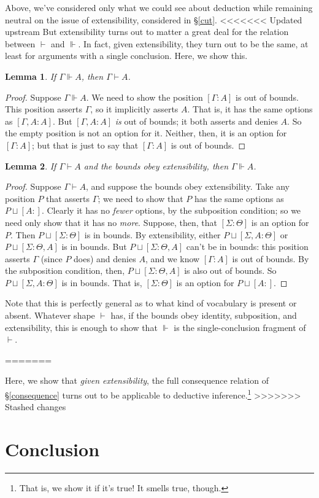 \documentclass{article}
\newcommand{\G}{\ensuremath{\Gamma}}
\newcommand{\Sig}{\ensuremath{\Sigma}}
\newcommand{\pcup}{\ensuremath{\sqcup}}
\newcommand{\pos}[2]{\ensuremath{[#1:#2]}}
\newcommand{\cns}{\vdash}
\newcommand{\ded}{\Vdash}
\newtheorem{lem}{Lemma}
\begin{document}
Above, we've considered only what we could see about deduction while remaining neutral on the issue of extensibility, considered in \S\ref{cut}.
<<<<<<< Updated upstream
But extensibility turns out to matter a great deal for the relation between $\cns$ and $\ded$.
In fact, given extensibility, they turn out to be the same, at least for arguments with a single conclusion. 
Here, we show this.

\begin{lem}
If $\G \ded A$, then $\G \cns A$.
\end{lem}

\begin{proof}
Suppose $\G \ded A$. 
We need to show the position $\pos{\G}{A}$ is out of bounds.
This position asserts $\G$, so it implicitly asserts $A$. 
That is, it has the same options as $\pos{\G, A}{A}$.
But $\pos{\G, A}{A}$ {\em is} out of bounds; it both asserts and denies $A$.
So the empty position is not an option for it.
Neither, then, it is an option for $\pos{\G}{A}$; but that is just to say that $\pos{\G}{A}$ is out of bounds.
\end{proof}

\begin{lem}
If $\G \cns A$ and the bounds obey extensibility, then $\G \ded A$.
\end{lem}

\begin{proof}
Suppose $\G \cns A$, and suppose the bounds obey extensibility.
Take any position $P$ that asserts $\G$; we need to show that $P$ has the same options as $P \pcup \pos{A}{}$.
Clearly it has no {\em fewer} options, by the subposition condition; so we need only show that it has no {\em more}.
Suppose, then, that $\pos{\Sig}{\Theta}$ is an option for $P$.
Then $P \pcup \pos{\Sig}{\Theta}$ is in bounds.
By extensibility, either $P \pcup \pos{\Sig, A}{\Theta}$ or $P \pcup \pos{\Sig}{\Theta, A}$ is in bounds.
But $P \pcup \pos{\Sig}{\Theta, A}$ can't be in bounds: this position asserts $\G$ (since $P$ does) and denies $A$, and we know $\pos{\G}{A}$ is out of bounds.
By the subposition condition, then, $P \pcup \pos{\Sig}{\Theta, A}$ is also out of bounds.
So $P \pcup \pos{\Sig, A}{\Theta}$ is in bounds.
That is, $\pos{\Sig}{\Theta}$ is an option for $P \pcup \pos{A}{}$.
\end{proof}

Note that this is perfectly general as to what kind of vocabulary is present or absent.
Whatever shape $\cns$ has, if the bounds obey identity, subposition, and extensibility, this is enough to show that $\ded$ is the single-conclusion fragment of $\cns$.

=======

Here, we show that {\em given extensibility}, the full consequence relation of \S\ref{consequence} turns out to be applicable to deductive inference.\footnote{That is, we show it if it's true! It smells true, though.}
>>>>>>> Stashed changes


\section{Conclusion}






\end{document}
